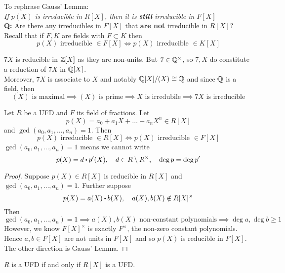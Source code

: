 \documentclass[../Main.tex]{subfiles}
\begin{document}
To rephrase Gauss' Lemma:\\ \textit{If $p(X)$ is irreducible in $R[X]$, then it is \textbf{still} irreducible in $F[X]$}\\
\textbf{Q:} Are there any irreducibles in $F[X]$ that \textbf{are not} irreducible in $R[X]$?\\
Recall that if $F,K$ are fields with $F\subset K$ then \[p(X) \text{ irreducible }\in F[X] \Longleftrightarrow p(X) \text{ irreducible }\in K[X]\]
\begin{example}
	$7X$ is reducible in $\mathbb{Z}[X]$ as they are non-units. But $7\in \mathbb{Q}^\times$, so $7,X$ do constitute a reduction of $7X$ in $\mathbb{Q}[X]$.\\
	Moreover, $7X$ is associate to $X$ and notably $\mathbb{Q}[X]/(X)\cong \mathbb{Q}$ and since $\mathbb{Q}$ is a field, then
	\[ (X) \text{ is maximal}\implies (X) \text{ is prime}\implies X\text{ is irredubile}\implies 7X\text{ is irreducible}\]
\end{example}
\begin{crl}[label=13.2]
	Let $R$ be a UFD and $F$ its field of fractions. Let
	\[p(X)=a_0+a_1X+\dots+a_nX^n \in R[X]\]
	and $\gcd(a_0,a_1,\dots,a_n)=1$. Then
	\[p(X) \text{ irreducible }\in R[X] \Longleftrightarrow p(X) \text{ irreducible }\in F[X]\]
	\Note $\gcd(a_0,a_1,\dots,a_n)=1$ means we cannot write
	\[p(X)=d\rdot p'(X),\quad d\in R\setminus R^\times, \quad \deg p =\deg p'\] 
\end{crl}
\begin{proof}
	Suppose $p(X)\in R[X]$ is reducible in $R[X]$ and $\gcd(a_0,a_1,\dots,a_n)=1$. Further suppose 
	\[p(X)=a(X)\rdot b(X),\quad a(X), b(X) \notin R[X]^\times \]
	Then
	\[\gcd(a_0,a_1,\dots,a_n)=1 \implies a(X), b(X) \text{ non-constant polynomials}\implies \deg a, \deg b\ge 1\]
	However, we know $F[X]^\times$ is exactly $F^\times$, the non-zero constant polynomials. Hence $a,b\in F[X]$ are not units in $F[X]$ and so $p(X)$ is reducible in $F[X]$.
	The other direction is Gauss' Lemma.
\end{proof}
\begin{thm}[title = \texorpdfstring{$R$ UFD $\Longleftrightarrow R[X]$ UFD}{R UFD iff R[X] UFD}]
	$R$ is a UFD if and only if $R[X]$ is a UFD.
\end{thm}
\end{document}
